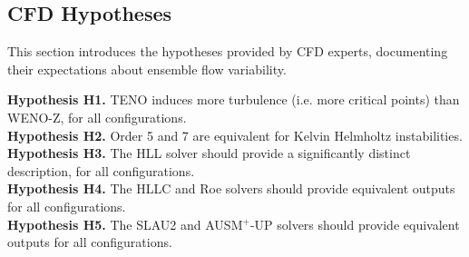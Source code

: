 \subsection{CFD Hypotheses}
\label{sec_hypotheses}
This section introduces the hypotheses provided by CFD experts, documenting their expectations about ensemble flow variability.


\label{Hypotheses}
\noindent
\textbf{Hypothesis H1.}
TENO induces more turbulence (i.e. more critical points) than
WENO-Z, for all configurations.\\
\textbf{Hypothesis H2.}
Order 5 and 7 are equivalent for Kelvin Helmholtz instabilities.\\
\textbf{Hypothesis H3.}
The HLL solver should provide a significantly distinct description, for all configurations.\\
\textbf{Hypothesis H4.}
The HLLC and Roe solvers should provide equivalent outputs for all configurations.\\
\textbf{Hypothesis H5.}
The
SLAU2 and AUSM$^+$-UP solvers should provide equivalent outputs for all configurations.\\

